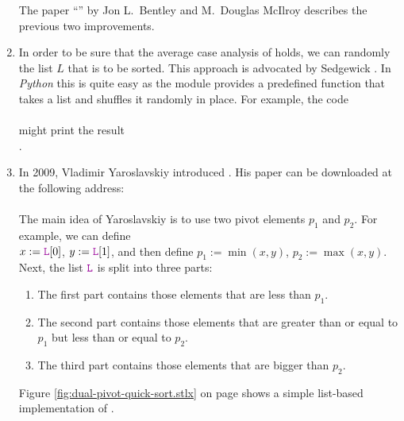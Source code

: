 \begin{enumerate}
      The paper ``'' by Jon L.~Bentley and M.~Douglas McIlroy
      \cite{bentley:93} describes the previous two improvements.
\item In order to be sure that the average case analysis of  holds, we can randomly
       the list $L$ that is to be sorted.  This approach is advocated by Sedgewick
      \cite{sedgewick:11}.  In \textsl{Python} this is quite easy as
      the module  provides a predefined function  that takes a list and shuffles
      it randomly in place.  For example, the code
      \\[0.2cm]
      \hspace*{1.3cm}
      \\[0.2cm]
      might print the result
      \\[0.2cm]
      \hspace*{1.3cm}
      \mytt{[1, 9, 8, 5, 2, 0, 6, 3, 4, 7]}.
\item In 2009, Vladimir Yaroslavskiy introduced 
      \cite{yaroslavskiy:2009}.
      His paper can be
      downloaded at the following address:
      \\[0.2cm]
      \hspace*{0.8cm}
      \href{http://codeblab.com/wp-content/uploads/2009/09/DualPivotQuicksort.pdf}{}
      \\[0.2cm]
      The main idea of Yaroslavskiy is to use two pivot elements $p_1$ and $p_2$.  For example, we can
      define
      \\[0.2cm]
      \hspace*{1.3cm}
      $x := \mytt{L}[0]$, $y := \mytt{L}[1]$, \quad and then define \quad $p_1 :=\min(x, y)$, $p_2 := \max(x, y)$.
      \\[0.2cm]
      Next, the list $\mytt{L}$ is split into three parts:
      \begin{enumerate}
      \item The first part contains those elements that are less than $p_1$.
      \item The second part contains those elements that are greater than or equal to $p_1$ but less than or
            equal to $p_2$.
      \item The third part contains those elements that are bigger than $p_2$.
      \end{enumerate}
      Figure \ref{fig:dual-pivot-quick-sort.stlx} on page \pageref{fig:dual-pivot-quick-sort.stlx}
      shows a simple list-based implementation of .


\end{enumerate}
